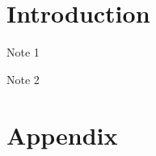 \documentclass[11pt]{article}
\author{}
\title{}
\begin{document}
	\maketitle
	\begin{abstract}
	\end{abstract}
	
	\section{Introduction}\label{section:intro}
	
	
	\begin{table}[H]
		\centering
		\begin{threeparttable}
			\caption{}
			\label{table:reg1}
			\begin{tablenotes}
				\small
				\item	Note 1
				\item Note 2
			\end{tablenotes}
		\end{threeparttable}
	\end{table}
	
	
%	
%	
	
	\newpage
	\appendix
	\section{Appendix}
	
\end{document}
